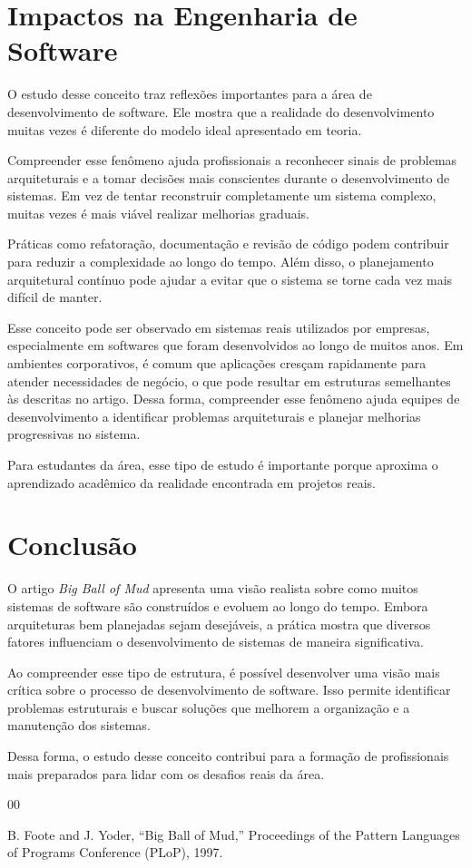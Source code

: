 \documentclass[conference]{IEEEtran}
\begin{document}
\section{Impactos na Engenharia de Software}

O estudo desse conceito traz reflexões importantes para a área de desenvolvimento de software. Ele mostra que a realidade do desenvolvimento muitas vezes é diferente do modelo ideal apresentado em teoria.

Compreender esse fenômeno ajuda profissionais a reconhecer sinais de problemas arquiteturais e a tomar decisões mais conscientes durante o desenvolvimento de sistemas. Em vez de tentar reconstruir completamente um sistema complexo, muitas vezes é mais viável realizar melhorias graduais.

Práticas como refatoração, documentação e revisão de código podem contribuir para reduzir a complexidade ao longo do tempo. Além disso, o planejamento arquitetural contínuo pode ajudar a evitar que o sistema se torne cada vez mais difícil de manter.

Esse conceito pode ser observado em sistemas reais utilizados por empresas, especialmente em softwares que foram desenvolvidos ao longo de muitos anos. Em ambientes corporativos, é comum que aplicações cresçam rapidamente para atender necessidades de negócio, o que pode resultar em estruturas semelhantes às descritas no artigo. Dessa forma, compreender esse fenômeno ajuda equipes de desenvolvimento a identificar problemas arquiteturais e planejar melhorias progressivas no sistema.

Para estudantes da área, esse tipo de estudo é importante porque aproxima o aprendizado acadêmico da realidade encontrada em projetos reais.

\section{Conclusão}

O artigo \textit{Big Ball of Mud} apresenta uma visão realista sobre como muitos sistemas de software são construídos e evoluem ao longo do tempo. Embora arquiteturas bem planejadas sejam desejáveis, a prática mostra que diversos fatores influenciam o desenvolvimento de sistemas de maneira significativa.

Ao compreender esse tipo de estrutura, é possível desenvolver uma visão mais crítica sobre o processo de desenvolvimento de software. Isso permite identificar problemas estruturais e buscar soluções que melhorem a organização e a manutenção dos sistemas.

Dessa forma, o estudo desse conceito contribui para a formação de profissionais mais preparados para lidar com os desafios reais da área.

\begin{thebibliography}{00}

B. Foote and J. Yoder,
``Big Ball of Mud,''
Proceedings of the Pattern Languages of Programs Conference (PLoP), 1997.

\end{thebibliography}
\end{document}
